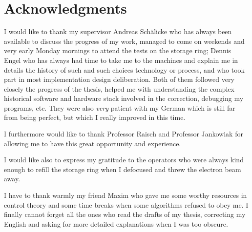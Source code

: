 
\chapter*{Acknowledgments}

I would like to thank my supervisor Andreas Schälicke who has always been available to discuss the progress of my work, managed to come on weekends and very early Monday mornings to attend the tests on the storage ring; Dennis Engel who has always had time to take me to the machines and explain me in details the history of such and such choices technology or process, and who took part in most implementation design deliberation. Both of them followed very closely the progress of the thesis, helped me with understanding the complex historical software and hardware stack involved in the correction, debugging my programs, etc. They were also \textit{very} patient with my German which is still far from being perfect, but which I really improved in this time.

I furthermore would like to thank Professor Raisch and Professor Jankowiak for allowing me to have this great opportunity and experience.

I would like also to express my gratitude to the operators who were always kind enough to refill the storage ring when I defocused and threw the electron beam away.

I have to thank warmly my friend Maxim who gave me some worthy resources in control theory and some time breaks when some algorithms refused to obey me. I finally cannot forget all the ones who read the drafts of my thesis, correcting my English and asking for more detailed explanations when I was too obscure.

